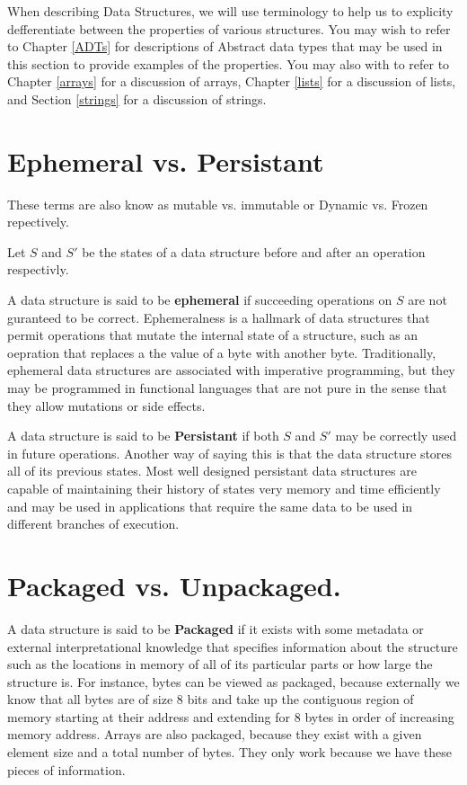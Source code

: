 \documentclass[12pt, letterpaper]{book}
\begin{document}
When describing Data Structures, we will use terminology to help us to explicity defferentiate between the properties of various structures. You may wish to refer to Chapter \ref{ADTs} for descriptions of Abstract data types that may be used in this section to provide examples of the properties. You may also with to refer to Chapter \ref{arrays} for a discussion of arrays, Chapter \ref{lists} for a discussion of lists, and Section \ref{strings} for a discussion of strings.

\section{Ephemeral vs. Persistant}
These terms are also know as mutable vs. immutable or Dynamic vs. Frozen repectively. 

Let $S$ and $S'$ be the states of a data structure before and after an operation respectivly.

A data structure is said to be \textbf{ephemeral} if succeeding operations on $S$ are not guranteed to be correct. Ephemeralness is a hallmark of data structures that permit operations that mutate the internal state of a structure, such as an oepration that replaces a the value of a byte with another byte. Traditionally, ephemeral data structures are associated with imperative programming, but they may be programmed in functional languages that are not pure in the sense that they allow mutations or side effects.

A data structure is said to be \textbf{Persistant} if both $S$ and $S'$ may be correctly used in future operations. Another way of saying this is that the data structure stores all of its previous states. Most well designed persistant data structures are capable of maintaining their history of states very memory and time efficiently and may be used in applications that require the same data to be used in different branches of execution.

\section{Packaged vs. Unpackaged.}

A data structure is said to be \textbf{Packaged} if it exists with some metadata or external interpretational knowledge that specifies information about the structure such as the locations in memory of all of its particular parts or how large the structure is. For instance, bytes can be viewed as packaged, because externally we know that all bytes are of size 8 bits and take up the contiguous region of memory starting at their address and extending for 8 bytes in order of increasing memory address. Arrays are also packaged, because they exist with a given element size and a total number of bytes. They only work because we have these pieces of information.
\end{document}
